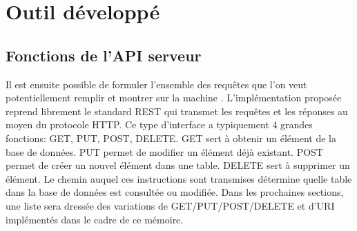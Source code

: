 \section{Outil développé}\label{ssec:outil_develope}
\subsection{Fonctions de l'API serveur}
Il est ensuite possible de formuler l'ensemble des requêtes que l'on veut potentiellement remplir et montrer sur la machine  \fg{}. L'implémentation proposée reprend librement le standard \ac{REST} \parencite{fielding_architectural_2000} qui transmet les requêtes et les réponses au moyen du protocole \ac{HTTP}. Ce type d'interface a typiquement 4 grandes fonctions: GET, PUT, POST, DELETE. GET sert à obtenir un élément de la base de données. PUT permet de modifier un élément déjà existant. POST permet de créer un nouvel élément dans une table. DELETE sert à supprimer un élément. Le chemin auquel ces instructions sont transmises détermine quelle table dans la base de données est consultée ou modifiée. Dans les prochaines sections, une liste sera dressée des variations de GET/PUT/POST/DELETE et d'\ac{URI} implémentés dans le cadre de ce mémoire.\clearpage
